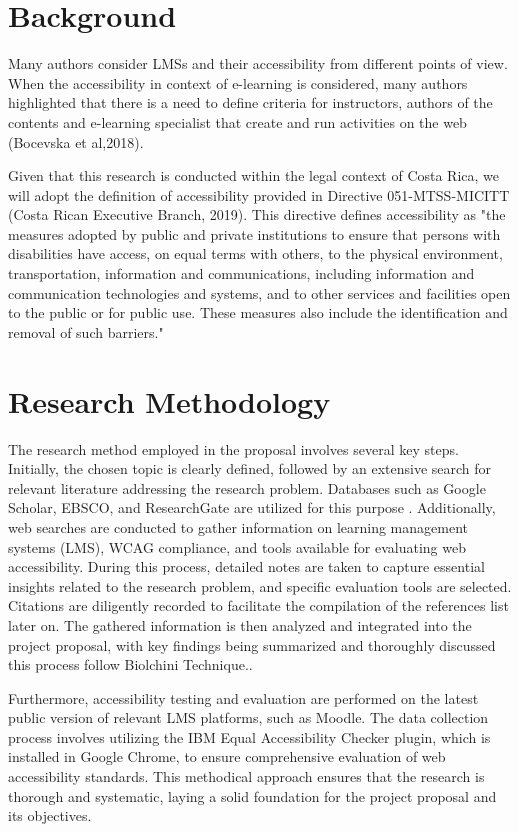 \documentclass{IEEEtran}
\begin{document}
\section{Background}
Many authors consider LMSs and their accessibility from different points of view. When the accessibility in context of e-learning is considered, many authors highlighted that there is a need to define criteria for instructors, authors of the contents and e-learning specialist that create and run activities on the web (Bocevska et al,2018).

Given that this research is conducted within the legal context of Costa Rica, we will adopt the definition of accessibility provided in Directive 051-MTSS-MICITT (Costa Rican Executive Branch, 2019). This directive defines accessibility as "the measures adopted by public and private institutions to ensure that persons with disabilities have access, on equal terms with others, to the physical environment, transportation, information and communications, including information and communication technologies and systems, and to other services and facilities open to the public or for public use. These measures also include the identification and removal of such barriers."

\section{Research Methodology}
The research method employed in the proposal involves several key steps. Initially, the chosen topic is clearly defined, followed by an extensive search for relevant literature addressing the research problem. Databases such as Google Scholar, EBSCO, and ResearchGate are utilized for this purpose  \cite{TTawalbeh2017}. Additionally, web searches are conducted to gather information on learning management systems (LMS), WCAG compliance, and tools available for evaluating web accessibility. During this process, detailed notes are taken to capture essential insights related to the research problem, and specific evaluation tools are selected. Citations are diligently recorded to facilitate the compilation of the references list later on. The gathered information is then analyzed and integrated into the project proposal, with key findings being summarized and thoroughly discussed this process follow Biolchini Technique.\cite{FerrariFabianoJose}.

Furthermore, accessibility testing and evaluation are performed on the latest public version of relevant LMS platforms, such as Moodle. The data collection process involves utilizing the IBM Equal Accessibility Checker plugin, which is installed in Google Chrome, to ensure comprehensive evaluation of web accessibility standards.
This methodical approach ensures that the research is thorough and systematic, laying a solid foundation for the project proposal and its objectives.
\end{document}
